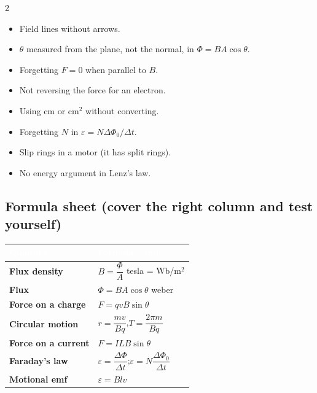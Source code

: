 \documentclass[11pt,a4paper]{article}
\newcounter{unit}
\begin{document}
\begin{examtip}
\begin{multicols}{2}\small
\begin{itemize}[leftmargin=4mm,itemsep=1pt]
\item Field lines without arrows.
\item $\theta$ measured from the plane, not the normal, in $\Phi=BA\cos\theta$.
\item Forgetting $F=0$ when parallel to $B$.
\item Not reversing the force for an electron.
\item Using cm or cm$^2$ without converting.
\item Forgetting $N$ in $\varepsilon=N\Delta\Phi_0/\Delta t$.
\item Slip rings in a motor (it has split rings).
\item No energy argument in Lenz's law.
\end{itemize}
\end{multicols}
\end{examtip}

\subsection*{\sffamily Formula sheet \normalfont\small(cover the right column and test yourself)}
\renewcommand{\arraystretch}{1.7}
\begin{tabularx}{\linewidth}{>{\bfseries\small}p{5.3cm}X}
\toprule
\rowcolor{ecred}\textcolor{white}{Quantity} & \textcolor{white}{\textbf{Formula / unit}}\\
\midrule
Flux density & $B=\dfrac{\Phi}{A}$ \quad tesla = Wb/m$^2$\\
Flux & $\Phi=BA\cos\theta$ \quad weber\\
Force on a charge & $F=qvB\sin\theta$\\
Circular motion & $r=\dfrac{mv}{Bq}$,\quad $T=\dfrac{2\pi m}{Bq}$\\
Force on a current & $F=ILB\sin\theta$\\
Faraday's law & $\varepsilon=\dfrac{\Delta\Phi}{\Delta t}$;\quad $\varepsilon=N\dfrac{\Delta\Phi_0}{\Delta t}$\\
Motional emf & $\varepsilon=Blv$\\
\bottomrule
\end{tabularx}
\end{document}
